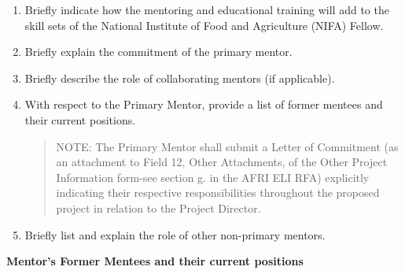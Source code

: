 \documentclass[12pt,letterpaper]{article}
\begin{document}
\begin{enumerate}

  \item Briefly indicate how the mentoring and educational training will add to the
   skill sets of the National Institute of Food and Agriculture (NIFA) Fellow.

  \item Briefly explain the commitment of the primary mentor.

  \item Briefly describe the role of collaborating mentors (if applicable).

  \item With respect to the Primary Mentor, provide a list of former mentees and
   their current positions. 
   \begin{quote}
   NOTE: The Primary Mentor shall submit a Letter of Commitment (as an
   attachment to Field 12, Other Attachments, of the Other Project
   Information form-see section g. in the AFRI ELI RFA) explicitly
   indicating their respective responsibilities throughout the proposed
   project in relation to the Project Director.
   \end{quote}

  \item Briefly list and explain the role of other non-primary mentors.

\end{enumerate}

\noindent \textbf{Mentor's Former Mentees and their current positions}





\end{document}
